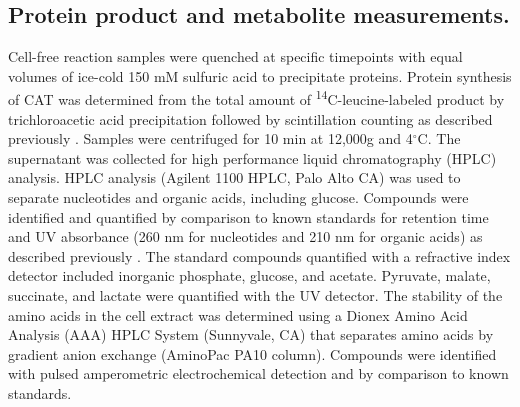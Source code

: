 \documentclass[journal=asbcd6,manuscript=article]{achemso}
\begin{document}
\subsection*{Protein product and metabolite measurements.}
Cell-free reaction samples were quenched at specific timepoints with equal volumes of ice-cold 150 mM sulfuric acid to precipitate proteins.
Protein synthesis of CAT was determined from the total amount of \textsuperscript{14}C-leucine-labeled product by trichloroacetic acid precipitation followed by scintillation counting as described previously \cite{2005_calhoun_BiotechnologyProgress}.
Samples were centrifuged for 10 min at 12,000g and 4$^{\circ}$C.
The supernatant was collected for high performance liquid chromatography (HPLC) analysis.
HPLC analysis (Agilent 1100 HPLC, Palo Alto CA) was used to separate nucleotides and organic acids, including glucose. Compounds were identified and quantified by comparison to known standards for retention time and UV absorbance (260 nm for nucleotides and 210 nm for organic acids) as described previously \cite{2005_calhoun_BiotechnologyProgress}.
The standard compounds quantified with a refractive index detector included inorganic phosphate, glucose, and acetate.
Pyruvate, malate, succinate, and lactate were quantified with the UV detector.
The stability of the amino acids in the cell extract was determined using a Dionex Amino Acid Analysis (AAA) HPLC System (Sunnyvale, CA) that separates amino acids by gradient anion exchange (AminoPac PA10 column).
Compounds were identified with pulsed amperometric electrochemical detection and by comparison to known standards.
\end{document}

